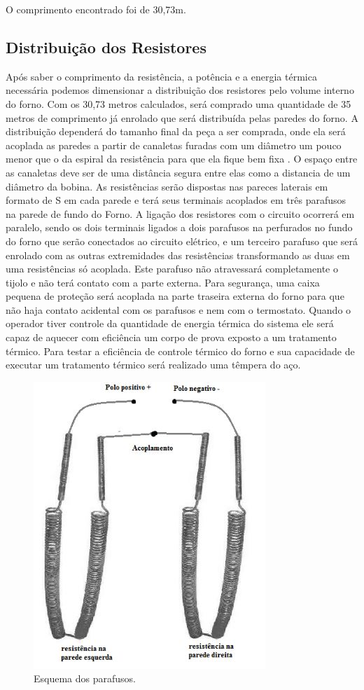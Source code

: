 O comprimento encontrado foi de 30,73m.

\subsection{Distribuição dos Resistores}

Após saber o comprimento da resistência, a potência e a energia térmica necessária podemos dimensionar a distribuição dos resistores pelo volume interno do forno. Com os 30,73 metros calculados, será comprado uma quantidade de 35 metros de comprimento já enrolado que será distribuída pelas paredes do forno. 
A distribuição dependerá do tamanho final da peça a ser comprada, onde ela será acoplada as paredes a partir de canaletas furadas com um diâmetro um pouco menor que o da espiral da resistência para que ela fique bem fixa . O espaço entre as canaletas deve ser de uma distância segura entre elas como a distancia de um diâmetro da bobina. As resistências serão dispostas nas pareces laterais em formato de S em cada parede e terá seus terminais acoplados em três parafusos na parede de fundo do Forno. A ligação dos resistores com o circuito ocorrerá em paralelo, sendo os dois terminais ligados a dois parafusos na perfurados no fundo do forno que serão conectados ao circuito elétrico, e um terceiro parafuso que será enrolado com as outras extremidades das resistências transformando as duas em uma resistências só acoplada. Este parafuso não atravessará completamente o tijolo e não terá contato com a parte externa. Para segurança, uma caixa pequena de proteção será acoplada na parte traseira externa do forno para que não haja contato acidental com os parafusos e nem com o termostato.
Quando o operador tiver controle da quantidade de energia térmica do sistema ele será capaz de aquecer com eficiência um corpo de prova exposto a um tratamento térmico. Para testar a eficiência de controle térmico do forno e sua capacidade de executar um tratamento térmico será realizado uma têmpera do aço.
\begin{figure}[!h]
	\centering
	\label{parafusos}
	\includegraphics[keepaspectratio=true,scale=0.8]{figuras/parafusos.JPG}
	\caption{Esquema dos parafusos.}
\end{figure}

